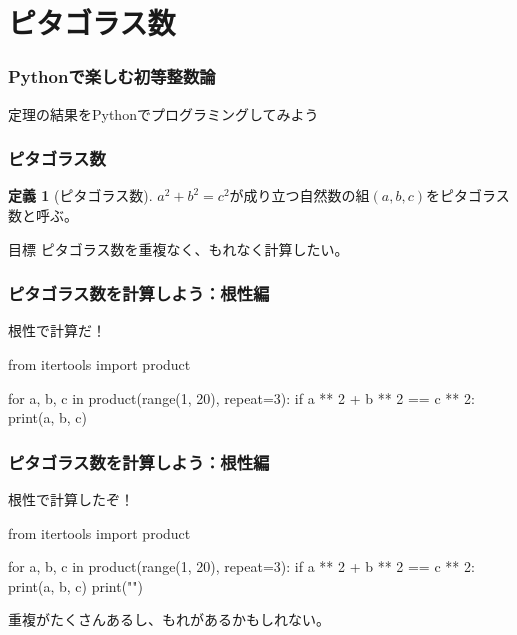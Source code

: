 \documentclass[dvipdfmx,11pt,notheorems]{beamer}
\theoremstyle{definition}
\newtheorem{definition}{定義}
\begin{document}
\section{ピタゴラス数}

\begin{frame}\frametitle{Pythonで楽しむ初等整数論}
\huge{定理の結果をPythonでプログラミングしてみよう}
\end{frame}

\begin{frame}\frametitle{ピタゴラス数}

\begin{definition}[ピタゴラス数]
$a^{2} + b^{2} = c^{2}$が成り立つ自然数の組$(a, b, c)$をピタゴラス数と呼ぶ。
\end{definition}

\begin{block}{目標}
ピタゴラス数を重複なく、もれなく計算したい。
\end{block}

\end{frame}

\begin{frame}[fragile]\frametitle{ピタゴラス数を計算しよう：根性編}

\begin{block}{根性で計算だ！}
\begin{pyverbatim}
from itertools import product

for a, b, c in product(range(1, 20), repeat=3):
    if a ** 2 + b ** 2 == c ** 2:
        print(a, b, c)
\end{pyverbatim}
\end{block}

\end{frame}

\begin{frame}[fragile]\frametitle{ピタゴラス数を計算しよう：根性編}

\begin{block}{根性で計算したぞ！}
\begin{pycode}
from itertools import product

for a, b, c in product(range(1, 20), repeat=3):
    if a ** 2 + b ** 2 == c ** 2:
        print(a, b, c)
        print("\n")
\end{pycode}
\end{block}

重複がたくさんあるし、もれがあるかもしれない。

\end{frame}
\end{document}
